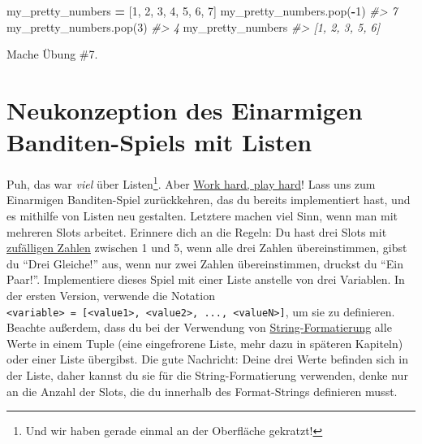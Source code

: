 \documentclass[
]{book}
\newenvironment{Shaded}{\begin{snugshade}}{\end{snugshade}}
\newcommand{\CommentTok}[1]{\textcolor[rgb]{0.56,0.35,0.01}{\textit{#1}}}
\newcommand{\DecValTok}[1]{\textcolor[rgb]{0.00,0.00,0.81}{#1}}
\newcommand{\NormalTok}[1]{#1}
\newcommand{\OperatorTok}[1]{\textcolor[rgb]{0.81,0.36,0.00}{\textbf{#1}}}
\begin{document}
\begin{Shaded}
\begin{Highlighting}[]
\NormalTok{my\_pretty\_numbers }\OperatorTok{=}\NormalTok{ [}\DecValTok{1}\NormalTok{, }\DecValTok{2}\NormalTok{, }\DecValTok{3}\NormalTok{, }\DecValTok{4}\NormalTok{, }\DecValTok{5}\NormalTok{, }\DecValTok{6}\NormalTok{, }\DecValTok{7}\NormalTok{]}
\NormalTok{my\_pretty\_numbers.pop(}\OperatorTok{{-}}\DecValTok{1}\NormalTok{)}
\CommentTok{\#\textgreater{} 7}
\NormalTok{my\_pretty\_numbers.pop(}\DecValTok{3}\NormalTok{)}
\CommentTok{\#\textgreater{} 4}
\NormalTok{my\_pretty\_numbers}
\CommentTok{\#\textgreater{} [1, 2, 3, 5, 6]}
\end{Highlighting}
\end{Shaded}

Mache Übung \#7.

\hypertarget{neukonzeption-des-einarmigen-banditen-spiels-mit-listen}{%
\section{Neukonzeption des Einarmigen Banditen-Spiels mit Listen}\label{neukonzeption-des-einarmigen-banditen-spiels-mit-listen}}

Puh, das war \emph{viel} über Listen\footnote{Und wir haben gerade einmal an der Oberfläche gekratzt!}. Aber \href{https://de.wiktionary.org/wiki/work_hard,_play_hard}{Work hard, play hard}! Lass uns zum Einarmigen Banditen-Spiel zurückkehren, das du bereits implementiert hast, und es mithilfe von Listen neu gestalten. Letztere machen viel Sinn, wenn man mit mehreren Slots arbeitet. Erinnere dich an die Regeln: Du hast drei Slots mit \href{https://docs.python.org/3/library/random.html\#random.randint}{zufälligen Zahlen} zwischen 1 und 5, wenn alle drei Zahlen übereinstimmen, gibst du ``Drei Gleiche!'' aus, wenn nur zwei Zahlen übereinstimmen, druckst du ``Ein Paar!''. Implementiere dieses Spiel mit einer Liste anstelle von drei Variablen. In der ersten Version, verwende die Notation \texttt{\textless{}variable\textgreater{}\ =\ {[}\textless{}value1\textgreater{},\ \textless{}value2\textgreater{},\ ...,\ \textless{}valueN\textgreater{}{]}}, um sie zu definieren. Beachte außerdem, dass du bei der Verwendung von \protect\hyperlink{string-formatierung}{String-Formatierung} alle Werte in einem Tuple (eine eingefrorene Liste, mehr dazu in späteren Kapiteln) oder einer Liste übergibst. Die gute Nachricht: Deine drei Werte befinden sich in der Liste, daher kannst du sie für die String-Formatierung verwenden, denke nur an die Anzahl der Slots, die du innerhalb des Format-Strings definieren musst.
\end{document}
